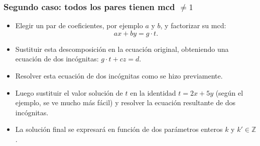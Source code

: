 \documentclass[a4paper,12pt]{article}
\begin{document}
\begin{procedimiento}
\begin{enumerate}
    \subsubsection*{Segundo caso: todos los pares tienen mcd \(\neq 1\)}
    \begin{itemize}
        \item Elegir un par de coeficientes, por ejemplo \(a\) y \(b\), y factorizar su mcd:
        \[
        a x + b y = g \cdot t.
        \]
        \item Sustituir esta descomposición en la ecuación original, obteniendo una ecuación de dos incógnitas: \(g \cdot t + c z = d\).
        \item Resolver esta ecuación de dos incógnitas como se hizo previamente.
        \item Luego sustituir el valor solución de \(t\) en la identidad \(t = 2x + 5y\) (según el ejemplo, se ve mucho más fácil) y resolver la ecuación resultante de dos incógnitas.
        \item La solución final se expresará en función de dos parámetros enteros \(k\) y \(k' \in \mathbb{Z}\).
    \end{itemize}
\end{enumerate}
\end{procedimiento}
\end{document}
